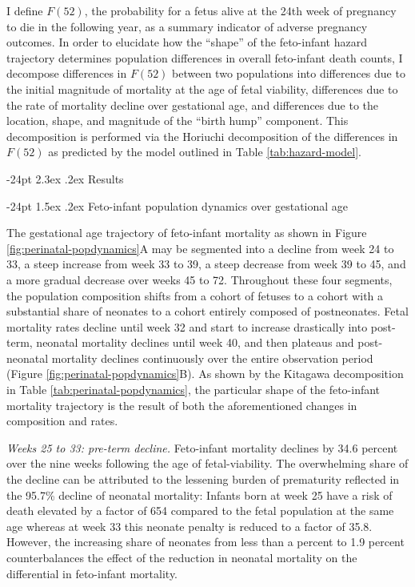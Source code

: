 \documentclass[10pt, twoside]{article}
\makeatletter
\renewcommand\section{\@startsection {section}{1}{\z@}%
                                   {-24pt}%
                                   {2.3ex \@plus.2ex}%
                                   {\normalfont\large\bfseries}}
\renewcommand\subsection{\@startsection{subsection}{2}{\z@}%
                                     {-24pt}%
                                     {1.5ex \@plus .2ex}%
                                     {\normalfont\normalsize\bfseries}}
\makeatother
\begin{document}
I define \(F(52)\), the probability for a fetus alive at the 24th week of pregnancy to die in the following year, as a summary indicator of adverse pregnancy outcomes. In order to elucidate how the ``shape'' of the feto-infant hazard trajectory determines population differences in overall feto-infant death counts, I decompose differences in \(F(52)\) between two populations into differences due to the initial magnitude of mortality at the age of fetal viability, differences due to the rate of mortality decline over gestational age, and differences due to the location, shape, and magnitude of the ``birth hump'' component. This decomposition is performed via the Horiuchi decomposition \citep{Horiuchi2008} of the differences in \(F(52)\) as predicted by the model outlined in Table \ref{tab:hazard-model}.

\hypertarget{results}{%
\section{Results}\label{results}}

\hypertarget{feto-infant-population-dynamics-over-gestational-age}{%
\subsection{Feto-infant population dynamics over gestational age}\label{feto-infant-population-dynamics-over-gestational-age}}

The gestational age trajectory of feto-infant mortality as shown in Figure \ref{fig:perinatal-popdynamics}A may be segmented into a decline from week 24 to 33, a steep increase from week 33 to 39, a steep decrease from week 39 to 45, and a more gradual decrease over weeks 45 to 72. Throughout these four segments, the population composition shifts from a cohort of fetuses to a cohort with a substantial share of neonates to a cohort entirely composed of postneonates. Fetal mortality rates decline until week 32 and start to increase drastically into post-term, neonatal mortality declines until week 40, and then plateaus and post-neonatal mortality declines continuously over the entire observation period (Figure \ref{fig:perinatal-popdynamics}B). As shown by the Kitagawa decomposition in Table \ref{tab:perinatal-popdynamics}, the particular shape of the feto-infant mortality trajectory is the result of both the aforementioned changes in composition and rates.

\emph{Weeks 25 to 33: pre-term decline.} Feto-infant mortality declines by 34.6 percent over the nine weeks following the age of fetal-viability. The overwhelming share of the decline can be attributed to the lessening burden of prematurity reflected in the 95.7\% decline of neonatal mortality: Infants born at week 25 have a risk of death elevated by a factor of 654 compared to the fetal population at the same age whereas at week 33 this neonate penalty is reduced to a factor of 35.8. However, the increasing share of neonates from less than a percent to 1.9 percent counterbalances the effect of the reduction in neonatal mortality on the differential in feto-infant mortality.
\end{document}
